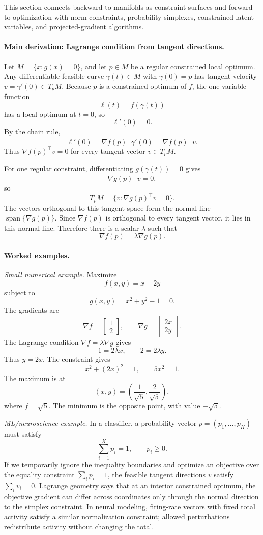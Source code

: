 This section connects backward to manifolds as constraint surfaces and forward to optimization with norm constraints, probability simplexes, constrained latent variables, and projected-gradient algorithms.

\paragraph{Main derivation: Lagrange condition from tangent directions.}
Let \(M=\{x:g(x)=0\}\), and let \(p\in M\) be a regular constrained local optimum. Any differentiable feasible curve \(\gamma(t)\in M\) with \(\gamma(0)=p\) has tangent velocity \(v=\gamma'(0)\in T_pM\). Because \(p\) is a constrained optimum of \(f\), the one-variable function
\[
\ell(t)=f(\gamma(t))
\]
has a local optimum at \(t=0\), so
\[
\ell'(0)=0.
\]
By the chain rule,
\[
\ell'(0)=\nabla f(p)^\top \gamma'(0)=\nabla f(p)^\top v.
\]
Thus \(\nabla f(p)^\top v=0\) for every tangent vector \(v\in T_pM\).

For one regular constraint, differentiating \(g(\gamma(t))=0\) gives
\[
\nabla g(p)^\top v=0,
\]
so
\[
T_pM=\{v:\nabla g(p)^\top v=0\}.
\]
The vectors orthogonal to this tangent space form the normal line \(\operatorname{span}\{\nabla g(p)\}\). Since \(\nabla f(p)\) is orthogonal to every tangent vector, it lies in this normal line. Therefore there is a scalar \(\lambda\) such that
\[
\nabla f(p)=\lambda\nabla g(p).
\]

\paragraph{Worked examples.}
\emph{Small numerical example.} Maximize
\[
f(x,y)=x+2y
\]
subject to
\[
g(x,y)=x^2+y^2-1=0.
\]
The gradients are
\[
\nabla f=
\begin{bmatrix}
1\\
2
\end{bmatrix},
\qquad
\nabla g=
\begin{bmatrix}
2x\\
2y
\end{bmatrix}.
\]
The Lagrange condition \(\nabla f=\lambda\nabla g\) gives
\[
1=2\lambda x,
\qquad
2=2\lambda y.
\]
Thus \(y=2x\). The constraint gives
\[
x^2+(2x)^2=1,
\qquad
5x^2=1.
\]
The maximum is at
\[
(x,y)=\left(\frac{1}{\sqrt{5}},\frac{2}{\sqrt{5}}\right),
\]
where \(f=\sqrt{5}\). The minimum is the opposite point, with value \(-\sqrt{5}\).

\emph{ML/neuroscience example.} In a classifier, a probability vector \(p=(p_1,\ldots,p_K)\) must satisfy
\[
\sum_{i=1}^K p_i=1,
\qquad
p_i\geq0.
\]
If we temporarily ignore the inequality boundaries and optimize an objective over the equality constraint \(\sum_i p_i=1\), the feasible tangent directions \(v\) satisfy \(\sum_i v_i=0\). Lagrange geometry says that at an interior constrained optimum, the objective gradient can differ across coordinates only through the normal direction to the simplex constraint. In neural modeling, firing-rate vectors with fixed total activity satisfy a similar normalization constraint; allowed perturbations redistribute activity without changing the total.

